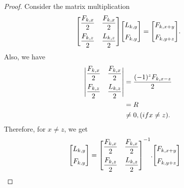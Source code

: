 \begin{proof}
Consider the matrix multiplication
$${
 \begin{bmatrix}{}
    \dfrac{F_{k,x}}{2} & \dfrac{F_{k,x}}{2}\vspace{.2cm} \\
    \dfrac{F_{k,z}}{2} & \dfrac{L_{k,z}}{2} \\
	\end{bmatrix}
	}{
 \begin{bmatrix}{}
    L_{k,y}\vspace{.2cm} \\
    F_{k,y} \\
	\end{bmatrix}
	}={
 \begin{bmatrix}{}
    F_{k,x+y}\vspace{.2cm} \\
    F_{k,y+z} \\
	\end{bmatrix}}.$$
	Also, we have	
	\begin{align*}
	{
 \begin{vmatrix}{}
    \dfrac{F_{k,x}}{2} & \dfrac{F_{k,x}}{2}\vspace{.2cm} \\
    \dfrac{F_{k,z}}{2} & \dfrac{L_{k,z}}{2} \\
	\end{vmatrix}
	}&=\dfrac{(-1)^zF_{k,x-z}}{2}\\
					&=R\\
					&\neq0, (if x\neq z).
	\end{align*}
	Therefore, for $x\neq z$, we get
	\begin{align*}
	{
 \begin{bmatrix}{}
    L_{k,y}\vspace{.2cm} \\
    F_{k,y} \\
	\end{bmatrix}
	}&={
 \begin{bmatrix}{}
    \dfrac{F_{k,x}}{2} & \dfrac{F_{k,x}}{2}\vspace{.2cm} \\
    \dfrac{F_{k,z}}{2} & \dfrac{L_{k,z}}{2} \\
	\end{bmatrix}
	^{-1}}.{
 \begin{bmatrix}{}
    F_{k,x+y}\vspace{.2cm} \\
    F_{k,y+z} \\
	\end{bmatrix}
}
\end{align*}
\end{proof}
